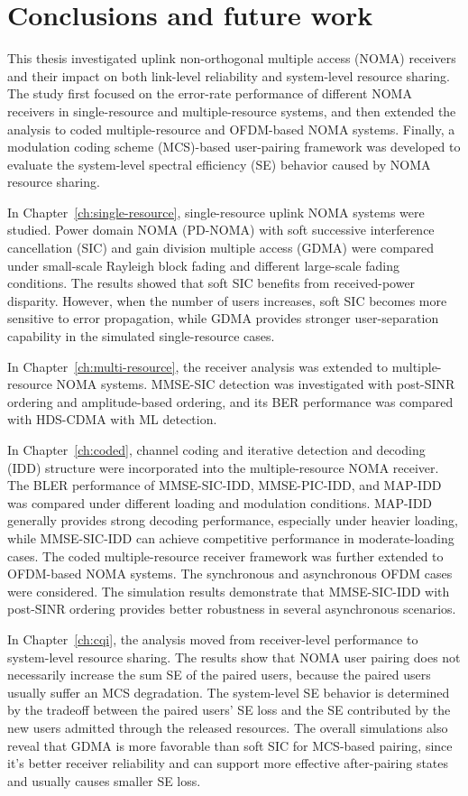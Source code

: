 \chapter{Conclusions and future work}
\label{ch:conclusions}

This thesis investigated uplink non-orthogonal multiple access (NOMA) receivers and their impact on both link-level reliability and system-level resource sharing. 
The study first focused on the error-rate performance of different NOMA receivers in single-resource and multiple-resource systems, and then extended the analysis to coded multiple-resource and OFDM-based NOMA systems. Finally, a modulation coding scheme (MCS)-based user-pairing framework was developed to evaluate the system-level spectral efficiency (SE) behavior caused by NOMA resource sharing.

In Chapter~\ref{ch:single-resource}, single-resource uplink NOMA systems were studied. Power domain NOMA (PD-NOMA) with soft successive interference cancellation (SIC) and gain division multiple access (GDMA) were compared under small-scale Rayleigh block fading and different large-scale fading conditions. 
The results showed that soft SIC benefits from received-power disparity. However, when the number of users increases, soft SIC becomes more sensitive to error propagation, while GDMA provides stronger user-separation capability in the simulated single-resource cases.

In Chapter~\ref{ch:multi-resource}, the receiver analysis was extended to multiple-resource NOMA systems. MMSE-SIC detection was investigated with post-SINR ordering and amplitude-based ordering, and its BER performance was compared with HDS-CDMA with ML detection. 

In Chapter~\ref{ch:coded}, channel coding and iterative detection and decoding (IDD) structure were incorporated into the multiple-resource NOMA receiver. The BLER performance of MMSE-SIC-IDD, MMSE-PIC-IDD, and MAP-IDD was compared under different loading and modulation conditions. 
MAP-IDD generally provides strong decoding performance, especially under heavier loading, while MMSE-SIC-IDD can achieve competitive performance in moderate-loading cases.
The coded multiple-resource receiver framework was further extended to OFDM-based NOMA systems. The synchronous and asynchronous OFDM cases were considered. 
The simulation results demonstrate that MMSE-SIC-IDD with post-SINR ordering provides better robustness in several asynchronous scenarios.

In Chapter~\ref{ch:cqi}, the analysis moved from receiver-level performance to system-level resource sharing. 
The results show that NOMA user pairing does not necessarily increase the sum SE of the paired users, because the paired users usually suffer an MCS degradation. 
The system-level SE behavior is determined by the tradeoff between the paired users' SE loss and the SE contributed by the new users admitted through the released resources. 
The overall simulations also reveal that GDMA is more favorable than soft SIC for MCS-based pairing, since it's better receiver reliability and can support more effective after-pairing states and usually causes smaller SE loss.

